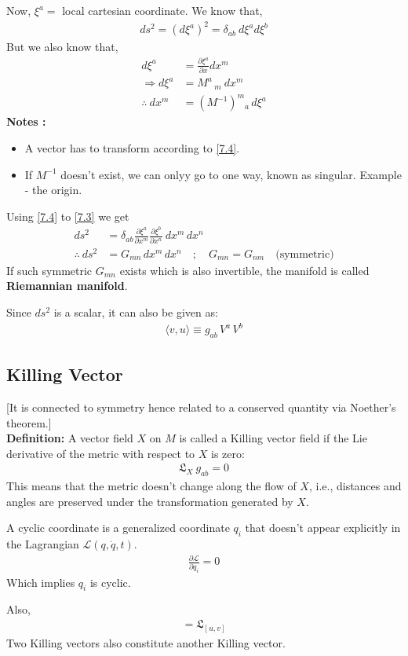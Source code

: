\documentclass[14pt]{article} %
\begin{document}
Now, $\xi^a =$ local cartesian coordinate. We know that,
\begin{align*}
ds^2 = \left( d \xi^a \right)^2 = \delta_{ab}~d\xi^a d\xi^b \tag{7.3} \label{7.3}
\end{align*}
But we also know that,
\begin{align*}
d\xi^a &= \frac{\partial\xi^a}{\partial x}dx^m \tag{7.4} \label{7.4} \\
\Rightarrow d\xi^a&= M^a\,_m ~dx^m \\
\therefore~ dx^m &= (M^{-1})^m{}_a \, d\xi^a
\end{align*}
\textbf{Notes :}
\begin{itemize}
\item A vector has to transform according to \eqref{7.4}.
\item If $M^{-1}$ doesn't exist, we can onlyy go to one way, known as singular. Example - the origin.
\end{itemize}
Using \eqref{7.4} to \eqref{7.3} we get
\begin{align*}
ds^2 &= \delta_{ab} \frac{\partial\xi^a}{\partial x^m} \frac{\partial  \xi^b}{\partial x^n}~dx^m \, dx^n \\
\therefore~ ds^2 &= G_{mn} \, dx^m \, dx^n \quad ; \quad G_{mn} = G_{nm} \quad \text{(symmetric)}
\end{align*}
If such symmetric $G_{mn}$ exists which is also invertible, the manifold is called \textbf{Riemannian manifold}.

Since $ds^2$ is a scalar, it can also be given as:
\begin{align*}
    \langle v, u \rangle \equiv g_{ab} \, V^a \, V^b
\end{align*}

\subsection{Killing Vector}
[It is connected to symmetry hence related to a conserved quantity via Noether's theorem.]\\

\noindent
\textbf{Definition:} A vector field $X$ on $M$ is called a Killing vector field if the Lie derivative of the metric with respect to $X$ is zero:
\begin{align*}
    \mathfrak{L}_X~g_{ab} = 0
\end{align*}
\noindent
This means that the metric doesn't change along the flow of $X$, i.e., distances and angles are preserved under the transformation generated by $X$.
\begin{tcolorbox}[ title=Cyclic Coordinates]
A cyclic coordinate is a generalized coordinate $q_i$ that doesn't appear explicitly in the Lagrangian $\mathcal{L}(q, \dot{q},t)$. 
\begin{align*}
    \frac{\partial \mathcal{L}}{\partial q_i} = 0
\end{align*}
Which implies $q_i$ is cyclic.

\end{tcolorbox}
Also,
\begin{align*}
    [\mathfrak{L}_u, \mathfrak{L}_v] = \mathfrak{L}_{[u, v]}
\end{align*}
Two Killing vectors also constitute another Killing vector.
\end{document}
